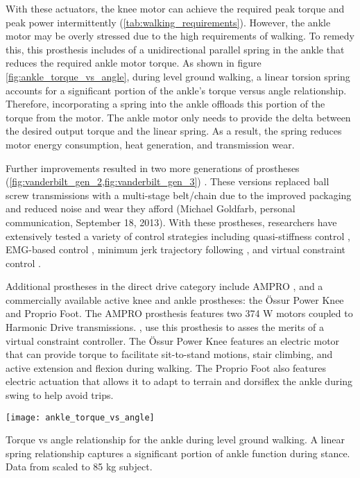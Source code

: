 With these actuators, the knee motor can achieve the required peak torque and
peak power intermittently (\cref{tab:walking_requirements}). However, the ankle
motor may be overly stressed due to the high requirements of walking. To remedy
this, this prosthesis includes of a unidirectional parallel spring in the ankle
that reduces the required ankle motor torque. As shown in figure
\cref{fig:ankle_torque_vs_angle}, during level ground walking, a linear torsion
spring accounts for a significant portion of the ankle's torque versus angle
relationship. Therefore, incorporating a spring into the ankle offloads this
portion of the torque from the motor. The ankle motor only needs to provide the
delta between the desired output torque and the linear spring. As a result, the
spring reduces motor energy consumption, heat generation, and transmission wear.

Further improvements resulted in two more generations of prostheses
(\cref{fig:vanderbilt_gen_2,fig:vanderbilt_gen_3}) \citep{lawson2013control,
lawson2014robotic}. These versions replaced ball screw transmissions with
a multi-stage belt/chain due to the improved packaging and reduced noise and
wear they afford (Michael Goldfarb, personal communication, September 18, 2013).
With these prostheses, researchers have extensively tested a variety of control
strategies including quasi-stiffness control \citep{sup2009preliminary,
sup2011upslope, lawson2013control, lawson2014robotic, lenzi2014speed}, EMG-based control
\citep{ha2011volitional, varol2010multiclass}, minimum jerk trajectory following
\citep{lenzi2014minimum}, and virtual constraint control
\citep{gregg2014virtual}. 

Additional prostheses in the direct drive category include AMPRO
\citep{zhao2016first}, and a commercially available active knee and ankle
prostheses: the Össur Power Knee and Proprio Foot. The AMPRO prosthesis features
two 374 W motors coupled to Harmonic Drive transmissions.
\citet{zhao2016first}, use this prosthesis to asses the merits of a virtual
constraint controller. The Össur Power Knee features an electric motor that can
provide torque to facilitate sit-to-stand motions, stair climbing, and active
extension and flexion during walking. The Proprio Foot also features electric
actuation that allows it to adapt to terrain and dorsiflex the ankle during
swing to help avoid trips. 
\begin{marginfigure}
    \centering
    \texttt{[image: ankle\_torque\_vs\_angle]}
    \caption{Torque vs angle relationship for the ankle during level ground
    walking. A linear spring relationship captures a significant portion of
    ankle function during stance. Data from \citet{winter2009biomechanics}
    scaled to 85 kg subject.}
    \label{fig:ankle_torque_vs_angle}
\end{marginfigure}


